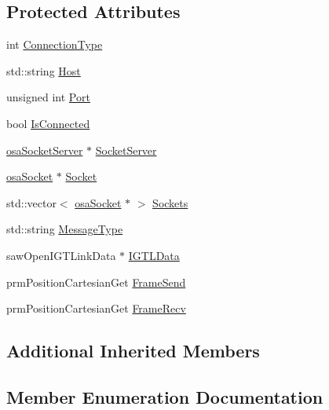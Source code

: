 \subsection*{Protected Attributes}
\begin{DoxyCompactItemize}
\item 
int \hyperlink{classmts_open_i_g_t_link_a62845fdde2c3186db262a28c1ef7ee85}{Connection\+Type}
\item 
std\+::string \hyperlink{classmts_open_i_g_t_link_aa416769aea8ba2074b1fa352c150facb}{Host}
\item 
unsigned int \hyperlink{classmts_open_i_g_t_link_a2e29caf8f3e7452f26f6908d17386ee1}{Port}
\item 
bool \hyperlink{classmts_open_i_g_t_link_abd2384165d5e4045215e695975780eef}{Is\+Connected}
\item 
\hyperlink{classosa_socket_server}{osa\+Socket\+Server} $\ast$ \hyperlink{classmts_open_i_g_t_link_adc1f9d5e4dbc18d71552a41d17940893}{Socket\+Server}
\item 
\hyperlink{classosa_socket}{osa\+Socket} $\ast$ \hyperlink{classmts_open_i_g_t_link_a92517a30507bb0c5f2717084bf6fcd01}{Socket}
\item 
std\+::vector$<$ \hyperlink{classosa_socket}{osa\+Socket} $\ast$ $>$ \hyperlink{classmts_open_i_g_t_link_ac8e7ec9abbd6cb65bbe6a45dd3c4ed80}{Sockets}
\item 
std\+::string \hyperlink{classmts_open_i_g_t_link_a093697b394242318dc24586d22b9a7d1}{Message\+Type}
\item 
saw\+Open\+I\+G\+T\+Link\+Data $\ast$ \hyperlink{classmts_open_i_g_t_link_a6ea66218c525d89e6ca0a5234d252078}{I\+G\+T\+L\+Data}
\item 
prm\+Position\+Cartesian\+Get \hyperlink{classmts_open_i_g_t_link_a97da17fac3c8d91dcd09005f06ded93a}{Frame\+Send}
\item 
prm\+Position\+Cartesian\+Get \hyperlink{classmts_open_i_g_t_link_aac470cfdb42709fbdb6d9228991204e2}{Frame\+Recv}
\end{DoxyCompactItemize}
\subsection*{Additional Inherited Members}


\subsection{Member Enumeration Documentation}
\hypertarget{classmts_open_i_g_t_link_aa7353a6a3f98f611defbaf89f13c8a27}{}
